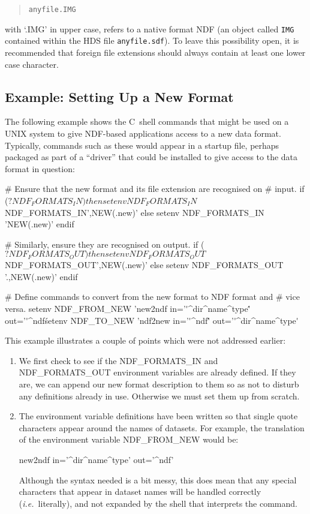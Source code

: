 \documentclass[11pt,twoside,nolof]{starlink}
\providecommand{\file}[1]{{\tt{#1}}}
\providecommand{\st}[1]{{\em{#1}}}
\begin{document}
\begin{quote}
\file{anyfile.IMG}
\end{quote}

with `.IMG' in upper case, refers to a native format NDF (an object
called \file{IMG} contained within the HDS file \file{anyfile.sdf}).
To leave this possibility open, it is recommended that foreign file
extensions should always contain at least one lower case character.

\subsection{Example: Setting Up a New Format}

The following example shows the C~shell commands that might be used on
a UNIX system to give NDF-based applications access to a new data
format. Typically, commands such as these would appear in a startup
file, perhaps packaged as part of a ``driver'' that could be installed
to give access to the data format in question:

\begin{terminalv}
#  Ensure that the new format and its file extension are recognised on
#  input.
      if ($?NDF_FORMATS_IN) then
         setenv NDF_FORMATS_IN $NDF_FORMATS_IN',NEW(.new)'
      else
         setenv NDF_FORMATS_IN 'NEW(.new)'
      endif

#  Similarly, ensure they are recognised on output.
      if ($?NDF_FORMATS_OUT) then
         setenv NDF_FORMATS_OUT $NDF_FORMATS_OUT',NEW(.new)'
      else
         setenv NDF_FORMATS_OUT '.,NEW(.new)'
      endif

#  Define commands to convert from the new format to NDF format and
#  vice versa.
      setenv NDF_FROM_NEW 'new2ndf in='\'^dir^name^type\'' out='\'^ndf\'
      setenv NDF_TO_NEW   'ndf2new in='\'^ndf\'' out='\'^dir^name^type\'
\end{terminalv}

This example illustrates a couple of points which were not addressed
earlier:

\begin{enumerate}
\item We first check to see if the NDF\_FORMATS\_IN and
NDF\_FORMATS\_OUT environment variables are already defined. If they
are, we can append our new format description to them so as not to
disturb any definitions already in use. Otherwise we must set them up
from scratch.

\item The environment variable definitions have been written so that
single quote characters appear around the names of datasets. For
example, the translation of the environment variable NDF\_FROM\_NEW
would be:
\begin{terminalv}
new2ndf in='^dir^name^type' out='^ndf'
\end{terminalv}

Although the syntax needed is a bit messy, this does mean that any
special characters that appear in dataset names will be handled
correctly (\st{i.e.}\ literally), and not expanded by the shell that
interprets the command.
\end{enumerate}
\end{document}
